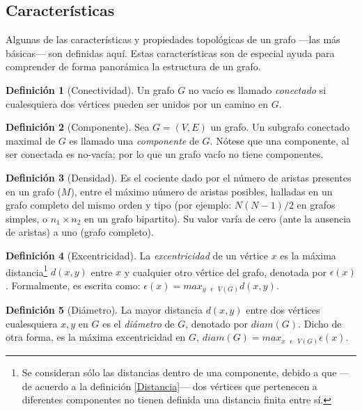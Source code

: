 \documentclass[letterpaper, 11pt]{book}
\theoremstyle{definition}
\newtheorem{definition}{Definición}[chapter]
\theoremstyle{remark}
\begin{document}
\subsection{Características}
\label{sec:Caracteristicas}

Algunas de las características y propiedades topológicas de un grafo ---las más básicas--- son definidas aquí. 
Estas características son de especial ayuda para comprender de forma panorámica la estructura de un grafo.


\begin{definition}[Conectividad]
\label{Conectividad}
	Un grafo $G$ no vacío es llamado \emph{conectado} si cualesquiera dos vértices pueden ser unidos por un camino en $G$.
\end{definition}

\begin{definition}[Componente]
\label{Componente}
	Sea $G=(V,E)$ un grafo. Un subgrafo conectado maximal de $G$ es llamado una \emph{componente} de $G$. Nótese que una componente, al ser conectada es no-vacía; por lo que un grafo vacío no tiene componentes.
\end{definition}

\begin{definition}[Densidad]
\label{Densidad}
    Es el cociente dado por el número de aristas presentes en un grafo ($M$), entre el máximo número de aristas posibles, halladas en un grafo completo del mismo orden y tipo (por ejemplo: $N(N-1)/2$ en grafos simples, o $n_{1} \times n_{2}$ en un grafo bipartito). 
    Su valor varía de cero (ante la ausencia de aristas) a uno (grafo completo).
\end{definition}


\begin{definition}[Excentricidad]
\label{Excentricidad}
	La \emph{excentricidad} de un vértice $x$ es la máxima distancia\footnote{Se consideran sólo las distancias dentro de una componente, debido a que ---de acuerdo a la definición \ref{Distancia}--- dos vértices que pertenecen a diferentes componentes no tienen definida una distancia finita entre sí.} $d(x,y)$ entre $x$ y cualquier otro vértice del grafo, denotada por $\epsilon(x)$. 
	Formalmente, es escrita como: $\epsilon(x) = max_{y \text{ } \epsilon \text{ } V(G)} d(x, y)$.
\end{definition}


\begin{definition}[Diámetro]
\label{Diametro}
	La mayor distancia $d(x,y)$ entre dos vértices cualesquiera $x,y$ en $G$ es el \emph{diámetro} de $G$, denotado por $diam(G)$. Dicho de otra forma, es la máxima excentricidad en $G$, $diam(G)= max_{x \text{ } \epsilon \text{ } V(G)} \epsilon(x)$.
\end{definition}
\end{document}

